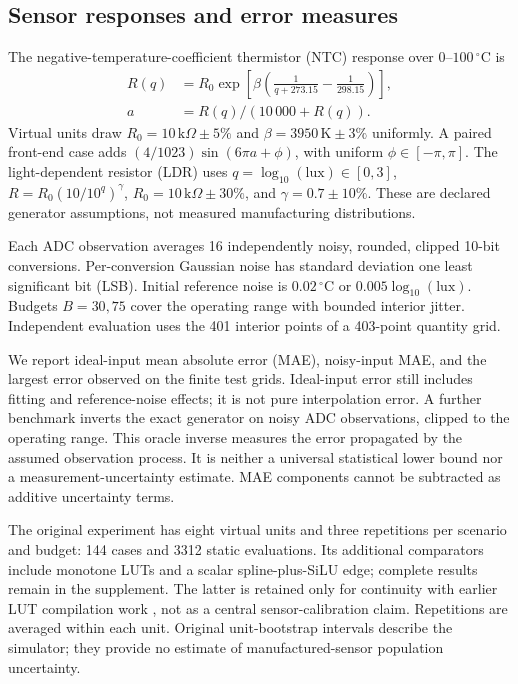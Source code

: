 \documentclass[journal,twoside,web]{ieeecolor}
\newcommand{\degC}{\ensuremath{^{\circ}\mathrm{C}}}
\begin{document}
\subsection{Sensor responses and error measures}
\normalcolor
The negative-temperature-coefficient thermistor (NTC) response over $0$--$100\,\degC$ is
\begin{equation}
\begin{aligned}
 R(q)&=R_0\exp\!\left[\beta\left(\frac1{q+273.15}-\frac1{298.15}\right)\right],\\
 a&=R(q)/(10\,000+R(q)).
\end{aligned}
\label{eq:ntc}
\end{equation}
Virtual units draw $R_0=10\,\mathrm{k}\Omega\pm5\%$ and $\beta=3950\,\mathrm{K}\pm3\%$ uniformly. A paired front-end case adds $(4/1023)\sin(6\pi a+\phi)$, with uniform $\phi\in[-\pi,\pi]$. The light-dependent resistor (LDR) uses $q=\log_{10}(\mathrm{lux})\in[0,3]$, $R=R_0(10/10^q)^\gamma$, $R_0=10\,\mathrm{k}\Omega\pm30\%$, and $\gamma=0.7\pm10\%$. These are declared generator assumptions, not measured manufacturing distributions.

Each ADC observation averages 16 independently noisy, rounded, clipped 10-bit conversions. Per-conversion Gaussian noise has standard deviation one least significant bit (LSB). Initial reference noise is $0.02\,\degC$ or $0.005\log_{10}(\mathrm{lux})$. Budgets $B=30,75$ cover the operating range with bounded interior jitter. Independent evaluation uses the 401 interior points of a 403-point quantity grid.

We report ideal-input mean absolute error (MAE), noisy-input MAE, and the largest error observed on the finite test grids. Ideal-input error still includes fitting and reference-noise effects; it is not pure interpolation error. A further benchmark inverts the exact generator on noisy ADC observations, clipped to the operating range. This oracle inverse measures the error propagated by the assumed observation process. It is neither a universal statistical lower bound nor a measurement-uncertainty estimate. MAE components cannot be subtracted as additive uncertainty terms.

The original experiment has eight virtual units and three repetitions per scenario and budget: 144 cases and 3312 static evaluations. Its additional comparators include monotone LUTs and a scalar spline-plus-SiLU edge; complete results remain in the supplement. The latter is retained only for continuity with earlier LUT compilation work \cite{kan,lutkan}, not as a central sensor-calibration claim. Repetitions are averaged within each unit. Original unit-bootstrap intervals describe the simulator; they provide no estimate of manufactured-sensor population uncertainty.
\end{document}
